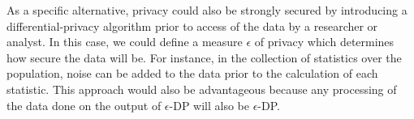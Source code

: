 As a specific alternative, privacy could also be strongly secured by introducing a differential-privacy algorithm prior to access of the data by a researcher or analyst. In this case, we could define a measure $\epsilon$ of privacy which determines how secure the data will be. For instance, in the collection of statistics over the population, noise can be added to the data prior to the calculation of each statistic. This approach would also be advantageous because any processing of the data done on the output of $\epsilon$-DP will also be $\epsilon$-DP.